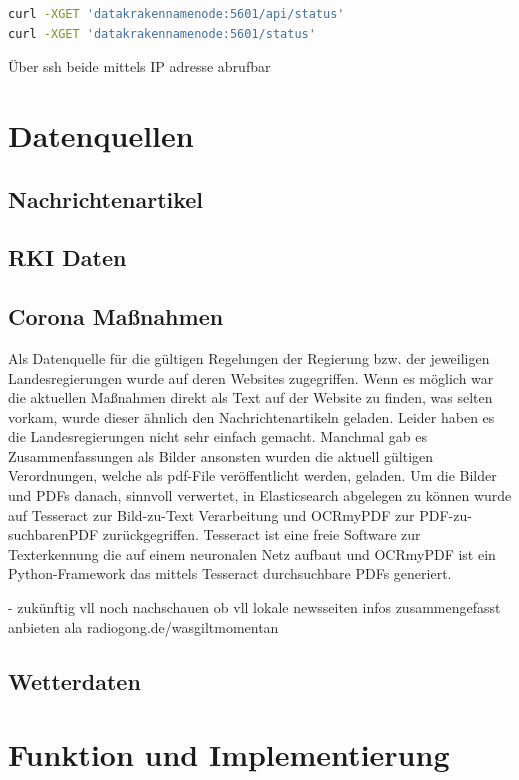 \documentclass[12pt,twoside,a4paper,parskip]{scrbook}
\begin{document}
\begin{lstlisting}[caption=Statusabfrage Kibana,label=statuskibana,language=bash]
curl -XGET 'datakrakennamenode:5601/api/status'
curl -XGET 'datakrakennamenode:5601/status'
\end{lstlisting}

Über ssh beide mittels IP adresse abrufbar

\chapter{Datenquellen}
\section{Nachrichtenartikel}
\section{RKI Daten}
\section{Corona Maßnahmen}
Als Datenquelle für die gültigen Regelungen der Regierung bzw. der jeweiligen Landesregierungen wurde auf deren Websites zugegriffen. Wenn es möglich war die aktuellen Maßnahmen direkt als Text auf der Website zu finden, was selten vorkam, wurde dieser ähnlich den Nachrichtenartikeln geladen. Leider haben es die Landesregierungen nicht sehr einfach gemacht. Manchmal gab es Zusammenfassungen als Bilder ansonsten wurden die aktuell gültigen Verordnungen, welche als pdf-File veröffentlicht werden, geladen. Um die Bilder und PDFs danach, sinnvoll verwertet, in Elasticsearch abgelegen zu können wurde auf Tesseract zur Bild-zu-Text Verarbeitung und OCRmyPDF zur PDF-zu-suchbarenPDF zurückgegriffen. Tesseract ist eine freie Software zur Texterkennung die auf einem neuronalen Netz aufbaut und OCRmyPDF ist ein Python-Framework das mittels Tesseract durchsuchbare PDFs generiert.

- zukünftig vll noch nachschauen ob vll lokale newsseiten infos zusammengefasst anbieten ala radiogong.de/wasgiltmomentan

\section{Wetterdaten}

\chapter{Funktion und Implementierung}
\end{document}
